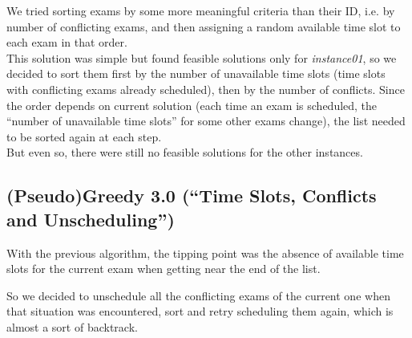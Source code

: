 \documentclass[11pt, a4paper, leqno]{article}
\begin{document}
	We tried sorting exams by some more meaningful criteria than their ID, i.e. by number of conflicting exams, and then assigning a random available time slot to each exam in that order.\\
	This solution was simple but found feasible solutions only for \textit{instance01}, so we decided to sort them first by the number of unavailable time slots (time slots with conflicting exams already scheduled), then by the number of conflicts. Since the order depends on current solution (each time an exam is scheduled, the ``number of unavailable time slots'' for some other exams change), the list needed to be sorted again at each step.\\
	But even so, there were still no feasible solutions for the other instances.
	\subsection{(Pseudo)Greedy 3.0 (``Time Slots, Conflicts and Unscheduling'')}
	
	With the previous algorithm, the tipping point was the absence of available time slots for the current exam when getting near the end of the list.
	
	So we decided to unschedule all the conflicting exams of the current one when that situation was encountered, sort and retry scheduling them again, which is almost a sort of backtrack.
	
\end{document}
